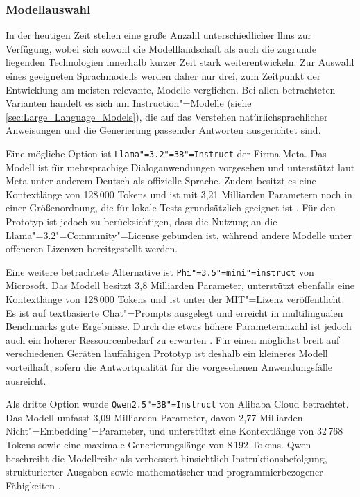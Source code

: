 \subsubsection{Modellauswahl}
\label{subsec:Modellauswahl}
In der heutigen Zeit stehen eine große Anzahl unterschiedlicher \glspl{llm} zur Verfügung, wobei sich sowohl die Modelllandschaft als auch die zugrunde liegenden Technologien innerhalb kurzer Zeit stark weiterentwickeln. Zur Auswahl eines geeigneten Sprachmodells werden daher nur drei, zum Zeitpunkt der Entwicklung am meisten relevante, Modelle verglichen. Bei allen betrachteten Varianten handelt es sich um Instruction"=Modelle (siehe \autoref{sec:Large_Language_Models}), die auf das Verstehen natürlichsprachlicher Anweisungen und die Generierung passender Antworten ausgerichtet sind.

Eine mögliche Option ist \texttt{Llama"=3.2"=3B"=Instruct} \autocite{Llama3-Documentation} der Firma Meta. Das Modell ist für mehrsprachige Dialoganwendungen vorgesehen und unterstützt laut Meta unter anderem Deutsch als offizielle Sprache. Zudem besitzt es eine Kontextlänge von 128\,000 Tokens und ist mit 3,21 Milliarden Parametern noch in einer Größenordnung, die für lokale Tests grundsätzlich geeignet ist \autocite{llama3TechnicalReport}. Für den Prototyp ist jedoch zu berücksichtigen, dass die Nutzung an die Llama"=3.2"=Community"=License gebunden ist, während andere Modelle unter offeneren Lizenzen bereitgestellt werden.

Eine weitere betrachtete Alternative ist \texttt{Phi"=3.5"=mini"=instruct} \autocite{Phi3-Documentation} von Microsoft. Das Modell besitzt 3,8 Milliarden Parameter, unterstützt ebenfalls eine Kontextlänge von 128\,000 Tokens und ist unter der MIT"=Lizenz veröffentlicht. Es ist auf textbasierte Chat"=Prompts ausgelegt und erreicht in multilingualen Benchmarks gute Ergebnisse. Durch die etwas höhere Parameteranzahl ist jedoch auch ein höherer Ressourcenbedarf zu erwarten \autocite{phi3TechnicalReport}. Für einen möglichst breit auf verschiedenen Geräten lauffähigen Prototyp ist deshalb ein kleineres Modell vorteilhaft, sofern die Antwortqualität für die vorgesehenen Anwendungsfälle ausreicht.

Als dritte Option wurde \texttt{Qwen2.5"=3B"=Instruct} \autocite{Qwen2.5-Documentation} von Alibaba Cloud betrachtet. Das Modell umfasst 3,09 Milliarden Parameter, davon 2,77 Milliarden Nicht"=Embedding"=Parameter, und unterstützt eine Kontextlänge von 32\,768 Tokens sowie eine maximale Generierungslänge von 8\,192 Tokens. Qwen beschreibt die Modellreihe als verbessert hinsichtlich Instruktionsbefolgung, strukturierter Ausgaben sowie mathematischer und programmierbezogener Fähigkeiten \autocite{qwen2TechnicalReport}.

